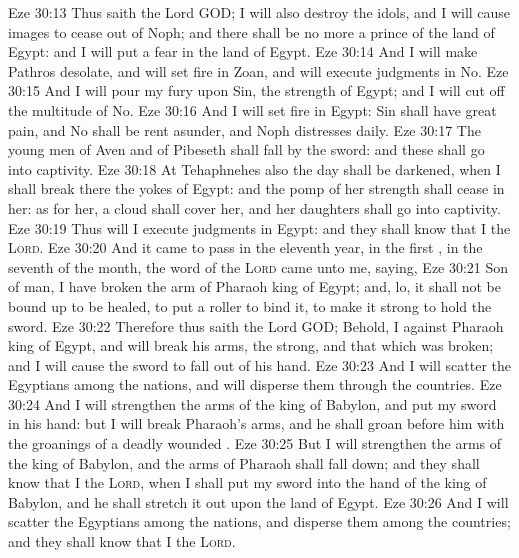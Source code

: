 \vs Eze 30:13 Thus saith the Lord GOD; I will also destroy the idols, and I will cause  images to cease out of Noph; and there shall be no more a prince of the land of Egypt: and I will put a fear in the land of Egypt.
\vs Eze 30:14 And I will make Pathros desolate, and will set fire in Zoan, and will execute judgments in No.
\vs Eze 30:15 And I will pour my fury upon Sin, the strength of Egypt; and I will cut off the multitude of No.
\vs Eze 30:16 And I will set fire in Egypt: Sin shall have great pain, and No shall be rent asunder, and Noph  distresses daily.
\vs Eze 30:17 The young men of Aven and of Pibeseth shall fall by the sword: and these  shall go into captivity.
\vs Eze 30:18 At Tehaphnehes also the day shall be darkened, when I shall break there the yokes of Egypt: and the pomp of her strength shall cease in her: as for her, a cloud shall cover her, and her daughters shall go into captivity.
\vs Eze 30:19 Thus will I execute judgments in Egypt: and they shall know that I  the \textsc{Lord}.
\vs Eze 30:20 And it came to pass in the eleventh year, in the first , in the seventh  of the month,  the word of the \textsc{Lord} came unto me, saying,
\vs Eze 30:21 Son of man, I have broken the arm of Pharaoh king of Egypt; and, lo, it shall not be bound up to be healed, to put a roller to bind it, to make it strong to hold the sword.
\vs Eze 30:22 Therefore thus saith the Lord GOD; Behold, I  against Pharaoh king of Egypt, and will break his arms, the strong, and that which was broken; and I will cause the sword to fall out of his hand.
\vs Eze 30:23 And I will scatter the Egyptians among the nations, and will disperse them through the countries.
\vs Eze 30:24 And I will strengthen the arms of the king of Babylon, and put my sword in his hand: but I will break Pharaoh's arms, and he shall groan before him with the groanings of a deadly wounded .
\vs Eze 30:25 But I will strengthen the arms of the king of Babylon, and the arms of Pharaoh shall fall down; and they shall know that I  the \textsc{Lord}, when I shall put my sword into the hand of the king of Babylon, and he shall stretch it out upon the land of Egypt.
\vs Eze 30:26 And I will scatter the Egyptians among the nations, and disperse them among the countries; and they shall know that I  the \textsc{Lord}.

